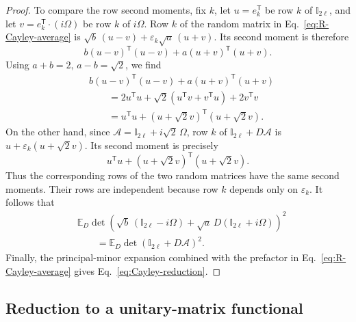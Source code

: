 \documentclass[aps,prl,twocolumn,superscriptaddress,reprint,longbibliography,nofootinbib]{revtex4-2}
\newcommand{\trans}{\mathsf{T}}
\begin{document}
\begin{proof}
To compare the row second moments, fix $k$, let $u=e_k^{\trans}$
be row $k$ of $\mathbb{I}_{2\ell}$, and let $v=e_k^\trans\cdot(i\Omega)$ be
row $k$ of $i\Omega$. Row $k$ of the random matrix in
Eq.~\eqref{eq:R-Cayley-average} is $\sqrt{b}\,(u-v)+\varepsilon_k\sqrt{a}\,(u+v)$.
Its second moment is therefore
\begin{equation}
    b(u-v)^{\trans}(u-v)+a(u+v)^{\trans}(u+v).
\end{equation}
Using $a+b=2,\, a-b=\sqrt{2}$, we find
\begin{equation}
    \begin{aligned}
&b(u-v)^{\trans}(u-v)+a(u+v)^{\trans}(u+v)\\
&\qquad=
2u^{\trans}u
+\sqrt{2}\left(u^{\trans}v+v^{\trans}u\right)
+2v^{\trans}v\\
&\qquad=
u^{\trans}u+
(u+\sqrt{2}v)^{\trans}(u+\sqrt{2}v).
\end{aligned}
\end{equation}
On the other hand, since
$\mathcal{A}=\mathbb{I}_{2\ell}+i\sqrt{2}\,\Omega$, row $k$ of
$\mathbb{I}_{2\ell}+D\mathcal{A}$ is $u+\varepsilon_k(u+\sqrt{2}v)$.
Its second moment is precisely
\begin{equation}
    u^{\trans}u+(u+\sqrt{2}v)^{\trans}(u+\sqrt{2}v).
\end{equation}
Thus the corresponding rows of the two random matrices have the
same second moments. Their rows are independent because row $k$
depends only on $\varepsilon_k$. It follows that
\begin{equation}
    \begin{aligned}
&\mathbb{E}_D
\det\!\left(
\sqrt{b}\,(\mathbb{I}_{2\ell}-i\Omega)
+\sqrt{a}\,D(\mathbb{I}_{2\ell}+i\Omega)
\right)^2\\
&\qquad=
\mathbb{E}_D\det(\mathbb{I}_{2\ell}+D\mathcal{A})^2.
\end{aligned}
\end{equation}
Finally, the principal-minor expansion combined with the prefactor in Eq.~\eqref{eq:R-Cayley-average} gives Eq.~\eqref{eq:Cayley-reduction}.
\end{proof}

\subsection{ Reduction to a unitary-matrix functional }
\label{app:proof:graph}
\end{document}
